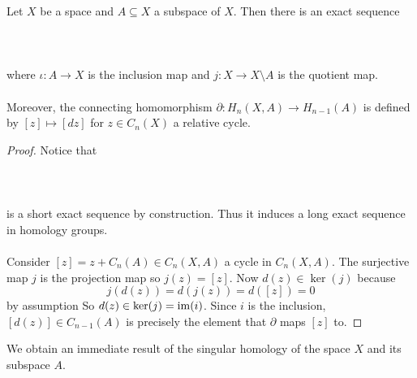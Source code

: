 \documentclass[a4paper]{article}
\begin{document}
\begin{thm}{}{} Let $X$ be a space and $A\subseteq X$ a subspace of $X$. Then there is an exact sequence \\~\\
\\~\\
where $\iota:A\to X$ is the inclusion map and $j:X\to X\setminus A$ is the quotient map. \\~\\
Moreover, the connecting homomorphism $\partial:H_n(X,A)\to H_{n-1}(A)$ is defined by $[z]\mapsto[dz]$ for $z\in C_n(X)$ a relative cycle. \tcbline
\begin{proof}
Notice that \\~\\
\\~\\
is a short exact sequence by construction. Thus it induces a long exact sequence in homology groups. \\~\\

Consider $[z]=z+C_n(A)\in C_n(X,A)$ a cycle in $C_n(X,A)$. The surjective map $j$ is the projection map so $j(z)=[z]$. Now $d(z)\in\ker(j)$ because $$j(d(z))=d(j(z))=d([z])=0$$ by assumption So $d(z)\in\ker(j)=\operatorname{im}(i)$. Since $i$ is the inclusion, $[d(z)]\in C_{n-1}(A)$ is precisely the element that $\partial$ maps $[z]$ to. 
\end{proof}
\end{thm}

We obtain an immediate result of the singular homology of the space $X$ and its subspace $A$. 
\end{document}
